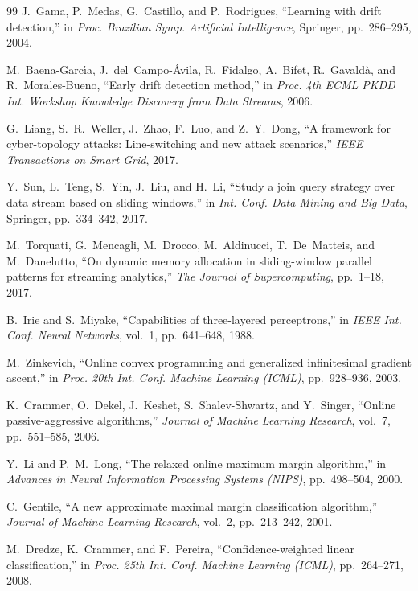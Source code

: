 \documentclass[12pt,a4paper]{article}
\begin{document}
\begin{thebibliography}{99}
		J.~Gama, P.~Medas, G.~Castillo, and P.~Rodrigues,
		``Learning with drift detection,''
		in \textit{Proc. Brazilian Symp. Artificial Intelligence}, Springer, pp.~286--295, 2004.
		
		M.~Baena-Garc\'{\i}a, J.~del~Campo-\'Avila, R.~Fidalgo, A.~Bifet, R.~Gavald\`{a}, and R.~Morales-Bueno,
		``Early drift detection method,''
		in \textit{Proc. 4th ECML PKDD Int. Workshop Knowledge Discovery from Data Streams}, 2006.
		
		G.~Liang, S.~R.~Weller, J.~Zhao, F.~Luo, and Z.~Y.~Dong,
		``A framework for cyber-topology attacks: Line-switching and new attack scenarios,''
		\textit{IEEE Transactions on Smart Grid}, 2017.
		
		Y.~Sun, L.~Teng, S.~Yin, J.~Liu, and H.~Li,
		``Study a join query strategy over data stream based on sliding windows,''
		in \textit{Int. Conf. Data Mining and Big Data}, Springer, pp.~334--342, 2017.
		
		M.~Torquati, G.~Mencagli, M.~Drocco, M.~Aldinucci, T.~De~Matteis, and M.~Danelutto,
		``On dynamic memory allocation in sliding-window parallel patterns for streaming analytics,''
		\textit{The Journal of Supercomputing}, pp.~1--18, 2017.
		
		B.~Irie and S.~Miyake,
		``Capabilities of three-layered perceptrons,''
		in \textit{IEEE Int. Conf. Neural Networks}, vol.~1, pp.~641--648, 1988.
		
		M.~Zinkevich,
		``Online convex programming and generalized infinitesimal gradient ascent,''
		in \textit{Proc. 20th Int. Conf. Machine Learning (ICML)}, pp.~928--936, 2003.
		
		K.~Crammer, O.~Dekel, J.~Keshet, S.~Shalev-Shwartz, and Y.~Singer,
		``Online passive-aggressive algorithms,''
		\textit{Journal of Machine Learning Research}, vol.~7, pp.~551--585, 2006.
		
		Y.~Li and P.~M.~Long,
		``The relaxed online maximum margin algorithm,''
		in \textit{Advances in Neural Information Processing Systems (NIPS)}, pp.~498--504, 2000.
		
		C.~Gentile,
		``A new approximate maximal margin classification algorithm,''
		\textit{Journal of Machine Learning Research}, vol.~2, pp.~213--242, 2001.
		
		M.~Dredze, K.~Crammer, and F.~Pereira,
		``Confidence-weighted linear classification,''
		in \textit{Proc. 25th Int. Conf. Machine Learning (ICML)}, pp.~264--271, 2008.
		

\end{thebibliography}
\end{document}
